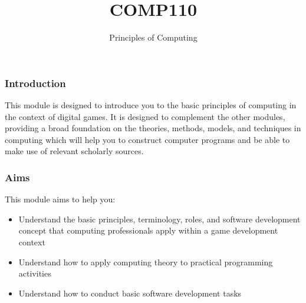 \documentclass[handout, xcolor={dvipsnames}]{beamer}\usepackage{etoolbox}\newtoggle{printable}\toggletrue{printable}
\begin{document}
\title{COMP110}
\subtitle{Principles of Computing}
\def\moduleLeader{Dr Edward Powley}
\def\academicStaff{Dr Michael Scott}

\frame{\titlepage} 

\begin{frame}
	\frametitle{Introduction}
	This module is designed to introduce you to the basic principles of computing in the context of digital games. It is designed to complement the other modules, providing a broad foundation on the theories, methods, models, and techniques in computing which will help you to construct computer programs and be able to make use of relevant scholarly sources.
	
\end{frame}

\begin{frame}
	\frametitle{Aims}
	
	This module aims to help you:
	
	\begin{itemize}
		\item Understand the basic principles, terminology, roles, and software development concept that computing professionals apply within a game development context 
		\item Understand how to apply computing theory to practical programming activities
		\item Understand how to conduct basic software development tasks
	\end{itemize}
\end{frame}
\end{document}
